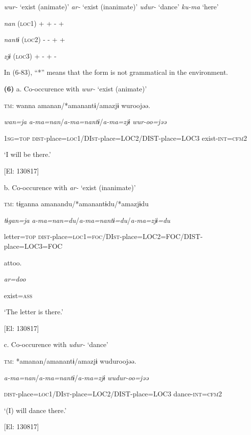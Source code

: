     \textit{wur-} ‘exist (animate)’  \textit{ar-} ‘exist (inanimate)’  \textit{udur-} ‘dance’    \textit{ku-ma} ‘here’

\textit{nan}  (\textsc{loc}1)  +  +  {}-    +

\textit{nantɨ}  (\textsc{loc}2)  {}-  {}-  +    +

\textit{zjɨ}  (\textsc{loc}3)  +  {}-  +    {}-

In (6-83), “*” means that the form is not grammatical in the environment.

\textbf{(6)}  a. Co-occurence with \textit{wur-} ‘exist (animate)’

  \textsc{tm}:  wanna  amanan/*amanantɨ/amazjɨ  wuroojəə.

    \textit{wan=ja}  \textit{a-ma=nan}/\textit{a-ma=nantɨ}/\textit{a-ma=zjɨ}  \textit{wur-oo=jəə}

    1\textsc{sg}=\textsc{top}  \textsc{dist}-place=\textsc{loc}1/DI\textsc{st}-place=LOC2/DIST-place=LOC3  exist-\textsc{int}=\textsc{cfm}2

    ‘I will be there.’

    [El: 130817]

  b. Co-occurence with \textit{ar-} ‘exist (inanimate)’

  \textsc{tm}:  tɨganna  amanandu/*amanantɨdu/*amazjɨdu

    \textit{tɨgan=ja}  \textit{a-ma=nan=du}/\textit{a-ma=nantɨ=du}/\textit{a-ma=zjɨ=du}

    letter=\textsc{top}  \textsc{dist}-place=\textsc{loc}1=\textsc{foc}/DI\textsc{st}-place=LOC2=FOC/DIST-place=LOC3=FOC

    attoo.  

    \textit{ar=doo}  

    exist=\textsc{ass}

    ‘The letter is there.’

    [El: 130817]

  c. Co-occurence with \textit{udur-} ‘dance’

  \textsc{tm}:  *amanan/amanantɨ/amazjɨ  wuduroojəə.

    \textit{a-ma=nan}/\textit{a-ma=nantɨ}/\textit{a-ma=zjɨ}  \textit{wudur-oo=jəə}

    \textsc{dist}-place=\textsc{loc}1/DI\textsc{st}-place=LOC2/DIST-place=LOC3  dance-\textsc{int}=\textsc{cfm}2

     ‘(I) will dance there.’

    [El: 130817]

